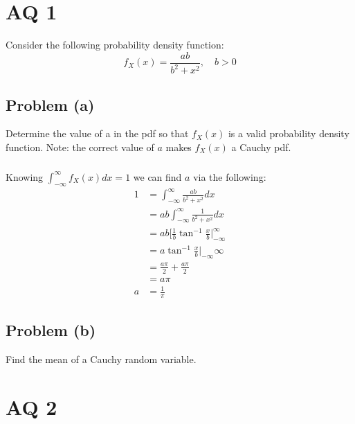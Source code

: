 \documentclass[11pt]{article}
\begin{document}
\section*{AQ 1}
Consider the following probability density function:
\begin{equation*}
	f_X(x) = \frac{ab}{b^2+x^2},\quad b>0
\end{equation*}

\subsection*{Problem (a)}
Determine the value of a in the pdf so that $f_X(x)$ is a valid probability density function. Note: the correct value of $a$ makes $f_X(x)$ a Cauchy pdf.

\subparagraph*{}
Knowing $\int_{-\infty}^\infty f_X(x)dx = 1$ we can find $a$ via the following:
\begin{align*}
	1 &= \int_{-\infty}^\infty \frac{ab}{b^2+x^2}dx \\
	&= ab\int_{-\infty}^\infty \frac{1}{b^2 + x^2}dx \\
	&= ab\Bigg[\frac{1}{b}\tan^{-1}\frac{x}{b}\Bigg|_{-\infty}^\infty \\
	&= a\tan^{-1}\frac{x}{b}\Bigg|_{-\infty}{\infty} \\
	&= \frac{a\pi}{2}  + \frac{a\pi}{2} \\
	&= a\pi \\ 
	a &= \frac{1}{\pi}
\end{align*}

\subsection*{Problem (b)}
Find the mean of a Cauchy random variable.

\section*{AQ 2}
\end{document}
